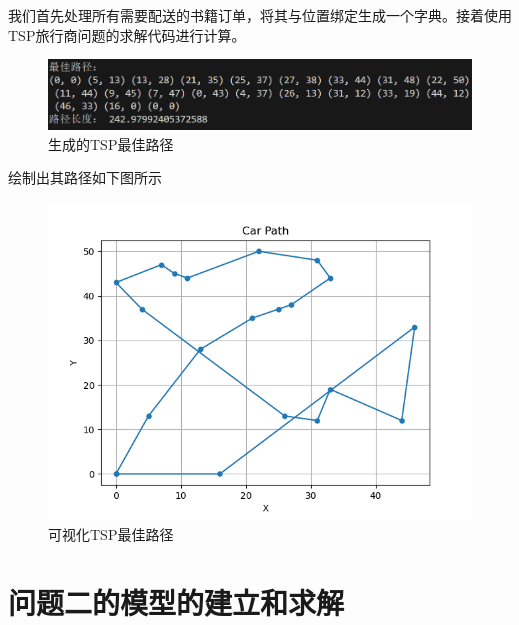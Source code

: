 \documentclass[withoutpreface,bwprint]{thesis-config}
\begin{document}
我们首先处理所有需要配送的书籍订单，将其与位置绑定生成一个字典。接着使用TSP旅行商问题的求解代码进行计算。



\begin{figure}[!htbp]
    \centering
    \begin{minipage}[b]{\linewidth}
        \centering
        \includegraphics[width=1\textwidth]{figures/result0.1.png}
        \caption{生成的TSP最佳路径}
    \end{minipage}
\end{figure}
\par 绘制出其路径如下图所示
    \begin{figure}[!htbp]
        \centering
        \begin{minipage}[b]{0.85\linewidth}
            \centering
            \includegraphics[width=1\textwidth]{figures/result0.2.png}
            \caption{可视化TSP最佳路径}
        \end{minipage}
    \end{figure}

\clearpage
\section{问题二的模型的建立和求解}
\end{document}
